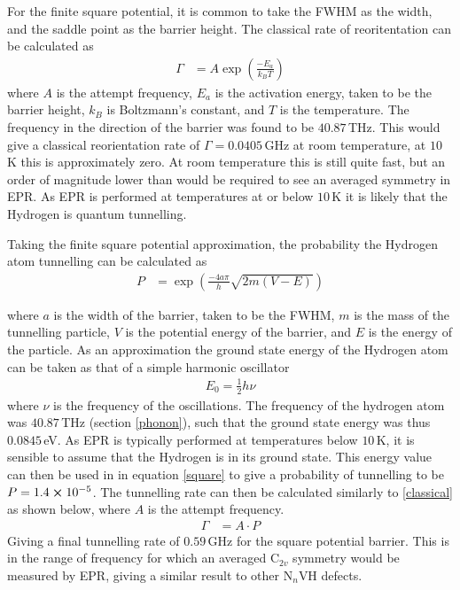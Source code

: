 \documentclass[10pt,a4paper,twocolumn,twoside]{extarticle}
\begin{document}
For the finite square potential, it is common to take the FWHM as the width, and the saddle point as the barrier height. The classical rate of reoritentation can be calculated as 
\begin{align}
    \label{classical}
    \Gamma &= A\exp({\frac{-E_a}{k_BT}})
\end{align}
where $A$ is the attempt frequency, $E_a$ is the activation energy, taken to be the barrier height, $k_B$ is Boltzmann's constant, and $T$ is the temperature. The frequency in the direction of the barrier was found to be $40.87$\,THz. This would give a classical reorientation rate of $\Gamma = 0.0405$\,GHz at room temperature, at $10$\,K this is approximately zero. At room temperature this is still quite fast, but an order of magnitude lower than would be required to see an averaged symmetry in EPR. As EPR is performed at temperatures at or below $10$\,K it is likely that the Hydrogen is quantum tunnelling. 

Taking the finite square potential approximation, the probability the Hydrogen atom tunnelling can be calculated as 
\begin{align}
    \label{square}
    P &= \exp(\frac{-4a\pi}{h}\sqrt{2m(V-E)})
\end{align}

where $a$ is the width of the barrier, taken to be the FWHM, $m$ is the mass of the tunnelling particle, $V$ is the potential energy of the barrier, and $E$ is the energy of the particle. As an approximation the ground state energy of the Hydrogen atom can be taken as that of a simple harmonic oscillator 
\begin{align}
    E_0 = \frac{1}{2}h\nu
\end{align}
where $\nu$ is the frequency of the oscillations. The frequency of the hydrogen atom was $40.87$\,THz (section \ref{phonon}), such that the ground state energy was thus $0.0845$\,eV. As EPR is typically performed at temperatures below $10$\,K, it is sensible to assume that the Hydrogen is in its ground state. This energy value can then be used in in equation \ref{square} to give a probability of tunnelling to be $P = 1.4\cross10^{-5}$. The tunnelling rate can then be calculated similarly to \ref{classical} as shown below, where $A$ is the attempt frequency. 
\begin{align}
    \Gamma &= A\cdot P
\end{align}
Giving a final tunnelling rate of $0.59$\,GHz for the square potential barrier. This is in the range of frequency for which an averaged C$_{2v}$ symmetry would be measured by EPR, giving a similar result to other N$_{n}$VH defects.
\end{document}
